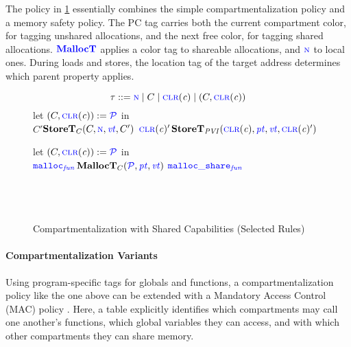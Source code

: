 \documentclass{llncs}
\begin{document}
The policy in \cref{fig:sharing} essentially combines the simple compartmentalization policy
and a memory safety policy. The PC tag carries both the current compartment color, for tagging
unshared allocations, and the next free color, for tagging shared allocations.
\(\malloctname\) applies a color tag to shareable allocations, and \(\N\) to local ones.
During loads and stores, the location tag of the target address
determines which parent property applies.

\begin{figure}[t]
  \color{blue}
  \begin{minipage}{0.5\textwidth}
    \[\tau ::= \N \mid C \mid \clr \mid (C,\clr)\]
    \scriptsize
    \storetruleblock
        {let \((C,\clr) := \PCT\) in \\
          \caseoftwo{\(\lt\)}
                    {\(C'\)}{\(\mathbf{StoreT}_C(C,\N,\vt,C')\)}
                    {\(\clr'\)}{\(\mathbf{StoreT}_{\mathit{PVI}}(\clr,\pt,\vt,\clr')\)}}
  \end{minipage}
  \begin{minipage}{0.5\textwidth}
    \scriptsize
    \malloctruleblock
      {let \((C,\clr) := \PCT\) in \\
        \caseoftwo{\(\pt\)}
                  {\(\FN[malloc]\)}{\(\mathbf{MallocT}_{C}(\PCT,\pt,\vt)\)}
                  {\(\FN[malloc\_share]\)}
                  {\\ \\
                     \\
                     \\}
      }
  \end{minipage}
  
  \caption{Compartmentalization with Shared Capabilities (Selected Rules)}
  \label{fig:sharing}
\end{figure}

\paragraph*{Compartmentalization Variants}

Using program-specific tags for globals and functions, a compartmentalization policy
like the one above can be extended with a Mandatory Access Control (MAC) policy \cite{Lampson74:Protection}.
Here, a table explicitly identifies which compartments may call one another's functions,
which global variables they can access, and with which other compartments they can share
memory.
\end{document}
